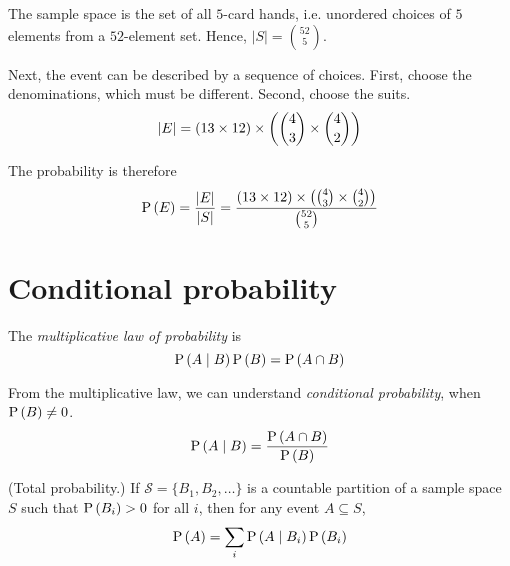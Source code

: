 \documentclass[11pt]{article}
\begin{document}
\begin{solution}
    The sample space is the set of all $5$-card hands, i.e. unordered choices
    of $5$ elements from a $52$-element set. Hence, $|S| = \binom{52}{5}$.

    Next, the event can be described by a sequence of choices. First, choose
    the denominations, which must be different. Second, choose the suits.
    \begin{equation*}
        |E| = (13 \times 12) \times \parens{\binom{4}{3} \times \binom{4}{2}}
    \end{equation*}

    The probability is therefore
    \begin{equation*}
        \P{E}
        = \frac{|E|}{|S|}
        = \frac{
            (13 \times 12) \times \parens{\binom{4}{3} \times \binom{4}{2}}
        }{
            \binom{52}{5}
        }
    \end{equation*}
\end{solution}

\section{Conditional probability}

\begin{defn}
    The \emph{multiplicative law of probability} is
    \begin{equation}
        \label{eq:multiplicative-law}
        \P{A \given B} \P{B} = \P{A \intersn B}
    \end{equation}

    From the multiplicative law, we can understand
    \emph{conditional probability}, when $\P{B} \neq 0$.
    \begin{equation}
        \label{eq:conditional-probability}
        \P{A \given B} = \frac{\P{A \intersn B}}{\P{B}}
    \end{equation}
\end{defn}

\begin{thm}{(Total probability.)}
    \label{thm:total-probability}
    If $\mathcal{S} = \{B_1, B_2, \ldots\}$ is a countable partition of a
    sample space $S$ such that $\P{B_i} > 0$ for all $i$, then for any event
    $A \subseteq S$,
    \begin{equation*}
        \P{A} = \sum_{i} \P{A \given B_i} \P{B_i}
    \end{equation*}
\end{thm}
\end{document}
